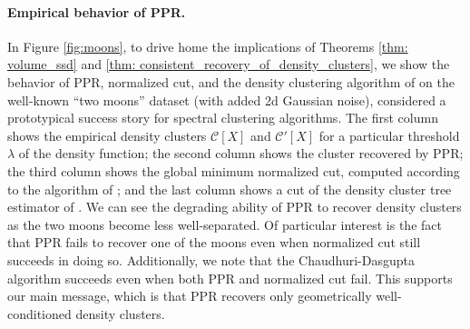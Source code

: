 \documentclass[11pt,twoside]{article}
\theoremstyle{definition}
\newcommand{\1}{\mathbbm{1}}
\newcommand{\Xbf}{X}
\newcommand{\Cset}{\mathcal{C}}
\begin{document}
\paragraph{Empirical behavior of PPR.} In Figure \ref{fig:moons}, to drive home 
the implications of Theorems \ref{thm: volume_ssd} and \ref{thm:
consistent_recovery_of_density_clusters}, we show the behavior of PPR,
normalized cut, and the density clustering algorithm of \citet{chaudhuri2010} on
the well-known ``two moons'' dataset (with added 2d Gaussian noise), considered
a prototypical success story for spectral clustering algorithms. The first
column shows the empirical density clusters $\Cset[\Xbf]$ and $\Cset'[\Xbf]$ for
a particular threshold $\lambda$ of the density function; the second column
shows the cluster recovered by PPR; the third column shows the global minimum
normalized cut, computed according to the algorithm of \citet{szlam2010}; and
the last column shows a cut of the density cluster tree estimator of
\citet{chaudhuri2010}.  We can see the degrading ability of PPR to recover
density clusters as the two moons become less well-separated. Of particular
interest is the fact that PPR fails to recover one of the moons even when
normalized cut still succeeds in doing so. Additionally, we note that the
Chaudhuri-Dasgupta algorithm succeeds even when both PPR and normalized cut
fail.  This supports our main message, which is that PPR recovers only
geometrically well-conditioned density clusters.
\end{document}
